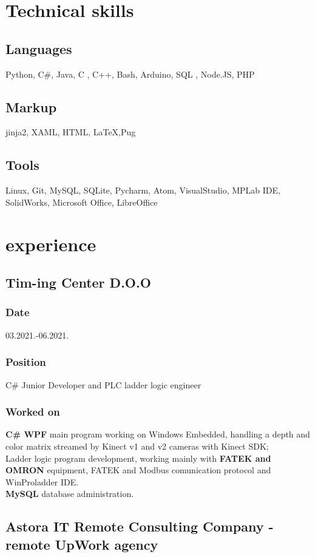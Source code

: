 \documentclass[10pt]{article}
\begin{document}
\section{Technical skills}
\subsection{Languages}
Python, C\#, Java, C , C++, Bash, Arduino, SQL , Node.JS, PHP
\subsection{Markup}
 jinja2, XAML, HTML, \LaTeX,Pug
\subsection{Tools}
Linux, Git, MySQL, SQLite, Pycharm, Atom, VisualStudio, MPLab IDE, SolidWorks,  Microsoft Office,  LibreOffice

\section{experience}
\subsection{\large{Tim-ing Center D.O.O}}
\subsubsection{Date}
03.2021.-06.2021.
\subsubsection{Position}
C\# Junior Developer and PLC ladder logic engineer
\subsubsection{Worked on}
\textbf{C\# WPF} main program working on Windows Embedded, handling a depth and color matrix streamed by Kinect v1 and v2 cameras with Kinect SDK;\\
Ladder logic program development, working mainly with \textbf{FATEK and OMRON} equipment, FATEK and Modbus comunication protocol and WinProladder IDE.\\
\textbf{MySQL} database administration.\\

\subsection{\large{Astora IT Remote Consulting Company - remote UpWork agency}}
\end{document}
